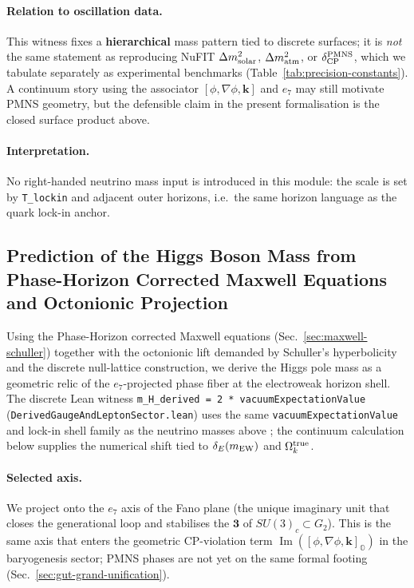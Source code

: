 \documentclass[12pt,a4paper]{article}
\begin{document}
\paragraph{Relation to oscillation data.}
This witness fixes a \textbf{hierarchical} mass pattern tied to discrete surfaces; it is \emph{not} the same statement as reproducing NuFIT \(\Delta m^2_{\rm solar}\), \(\Delta m^2_{\rm atm}\), or \(\delta_{\rm CP}^{\rm PMNS}\), which we tabulate separately as experimental benchmarks (Table~\ref{tab:precision-constants}). A continuum story using the associator \([\phi,\nabla\phi,\mathbf{k}]\) and \(e_7\) may still motivate PMNS geometry, but the defensible claim in the present formalisation is the closed surface product above.

\paragraph{Interpretation.}
No right-handed neutrino mass input is introduced in this module: the scale is set by \texttt{T\_lockin} and adjacent outer horizons, i.e.\ the same horizon language as the quark lock-in anchor.

\subsection{Prediction of the Higgs Boson Mass from Phase-Horizon Corrected Maxwell Equations and Octonionic Projection}

Using the Phase-Horizon corrected Maxwell equations (Sec.~\ref{sec:maxwell-schuller}) together with the octonionic lift demanded by Schuller's hyperbolicity and the discrete null-lattice construction, we derive the Higgs pole mass as a geometric relic of the $e_7$-projected phase fiber at the electroweak horizon shell. The discrete Lean witness \texttt{m\_H\_derived = 2 * vacuumExpectationValue} (\texttt{DerivedGaugeAndLeptonSector.lean}) uses the same \texttt{vacuumExpectationValue} and lock-in shell family as the neutrino masses above \citep{hqiv-lean}; the continuum calculation below supplies the numerical shift tied to $\delta_E(m_{\rm EW})$ and $\Omega_k^{\rm true}$.

\paragraph{Selected axis.} We project onto the $e_7$ axis of the Fano plane (the unique imaginary unit that closes the generational loop and stabilises the $\mathbf{3}$ of $SU(3)_c \subset G_2$). This is the same axis that enters the geometric CP-violation term $\operatorname{Im}([ \phi, \nabla\phi, \mathbf{k} ]_{\mathbb{O}})$ in the baryogenesis sector; PMNS phases are not yet on the same formal footing (Sec.~\ref{sec:gut-grand-unification}).
\end{document}
